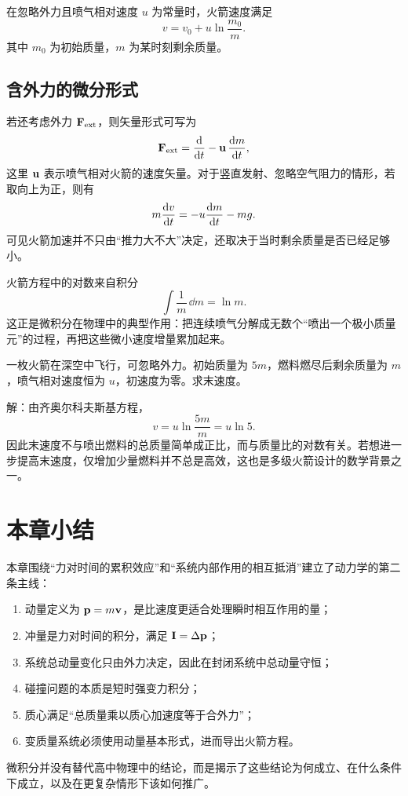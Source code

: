 \begin{law}[齐奥尔科夫斯基火箭方程]
在忽略外力且喷气相对速度 $u$ 为常量时，火箭速度满足
\[
v=v_0+u\ln\frac{m_0}{m}.
\]
其中 $m_0$ 为初始质量，$m$ 为某时刻剩余质量。
\end{law}

\subsection{含外力的微分形式}

若还考虑外力 $\vb F_{\text{ext}}$，则矢量形式可写为
\[
\vb F_{\text{ext}}=\dv{}{t}(m\vb v)-\vb u\,\dv{m}{t},
\]
这里 $\vb u$ 表示喷气相对火箭的速度矢量。对于竖直发射、忽略空气阻力的情形，若取向上为正，则有
\[
m\dv{v}{t}=-u\dv{m}{t}-mg.
\]
可见火箭加速并不只由“推力大不大”决定，还取决于当时剩余质量是否已经足够小。

\begin{remark}
火箭方程中的对数来自积分
\[
\int \frac{1}{m}\,\dd m=\ln m.
\]
这正是微积分在物理中的典型作用：把连续喷气分解成无数个“喷出一个极小质量元”的过程，再把这些微小速度增量累加起来。
\end{remark}

\begin{example}
一枚火箭在深空中飞行，可忽略外力。初始质量为 $5m$，燃料燃尽后剩余质量为 $m$，喷气相对速度恒为 $u$，初速度为零。求末速度。

解：由齐奥尔科夫斯基方程，
\[
v=u\ln\frac{5m}{m}=u\ln 5.
\]
因此末速度不与喷出燃料的总质量简单成正比，而与质量比的对数有关。若想进一步提高末速度，仅增加少量燃料并不总是高效，这也是多级火箭设计的数学背景之一。
\end{example}

\section*{本章小结}

本章围绕“力对时间的累积效应”和“系统内部作用的相互抵消”建立了动力学的第二条主线：
\begin{enumerate}
  \item 动量定义为 $\vb p=m\vb v$，是比速度更适合处理瞬时相互作用的量；
  \item 冲量是力对时间的积分，满足 $\vb I=\Delta\vb p$；
  \item 系统总动量变化只由外力决定，因此在封闭系统中总动量守恒；
  \item 碰撞问题的本质是短时强变力积分；
  \item 质心满足“总质量乘以质心加速度等于合外力”；
  \item 变质量系统必须使用动量基本形式，进而导出火箭方程。
\end{enumerate}
微积分并没有替代高中物理中的结论，而是揭示了这些结论为何成立、在什么条件下成立，以及在更复杂情形下该如何推广。

